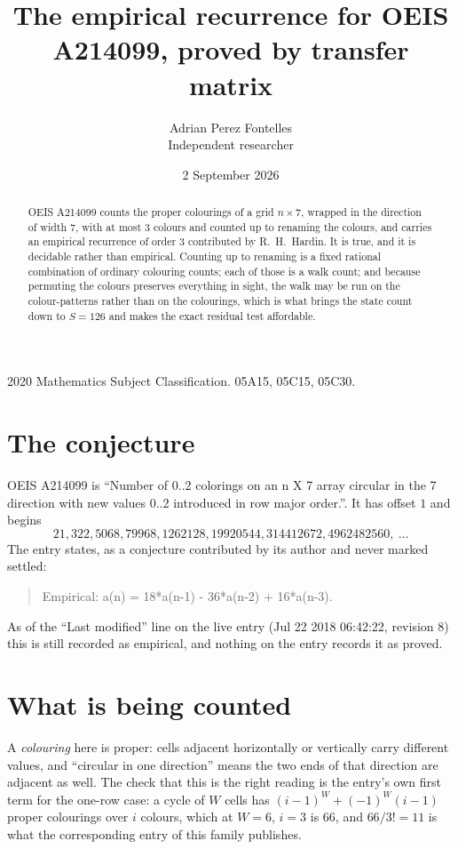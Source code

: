 \documentclass[11pt,a4paper]{article}
\title{The empirical recurrence for OEIS A214099, proved by transfer matrix}
\author{Adrian Perez Fontelles\\ \small Independent researcher}
\date{2 September 2026}
\theoremstyle{plain}
\theoremstyle{definition}
\begin{document}
\maketitle

\begin{abstract}
OEIS A214099 counts the proper colourings of a grid $n\times7$, wrapped in the direction of width $7$, with at most $3$ colours and
counted up to renaming the colours, and carries an empirical recurrence of order $3$
contributed by R.~H.~Hardin. It is true, and it is decidable rather than empirical. Counting
up to renaming is a fixed rational combination of ordinary colouring counts; each of those is
a walk count; and because permuting the colours preserves everything in sight, the walk may be
run on the colour-patterns rather than on the colourings, which is what brings the state count
down to $S=126$ and makes the exact residual test affordable.
\end{abstract}

\noindent\small 2020 Mathematics Subject Classification. 05A15, 05C15, 05C30.\normalsize

\section{The conjecture}

OEIS A214099 is ``Number of 0..2 colorings on an n X 7 array circular in the 7 direction with new values 0..2 introduced in row major order.''. It has offset $1$ and begins
\[
21, 322, 5068, 79968, 1262128, 19920544, 314412672, 4962482560,\ \dots
\]
The entry states, as a conjecture contributed by its author and never marked settled:
\begin{quote}
Empirical: a(n) = 18*a(n-1) - 36*a(n-2) + 16*a(n-3).
\end{quote}
As of the ``Last modified'' line on the live entry (Jul 22 2018 06:42:22, revision 8) this is still
recorded as empirical, and nothing on the entry records it as proved.

\section{What is being counted}

A \emph{colouring} here is proper: cells adjacent horizontally or vertically carry different
values, and ``circular in one direction'' means the two ends of that direction are adjacent as
well. The check that this is the right reading is the entry's own first term for the
one-row case: a cycle of $W$ cells has $(i-1)^W+(-1)^W(i-1)$ proper colourings over $i$
colours, which at $W=6$, $i=3$ is $66$, and $66/3!=11$ is what the corresponding entry of this
family publishes.
\end{document}
